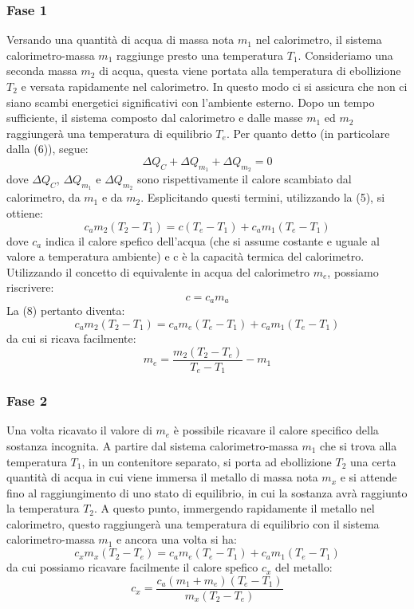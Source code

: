 \subsubsection{Fase 1}
Versando una quantità di acqua di massa nota $m_1$ nel calorimetro, il sistema calorimetro-massa $m_1$ raggiunge presto una temperatura $T_1$. Consideriamo una seconda massa $m_2$ di acqua, questa viene portata alla temperatura di ebollizione $T_2$ e versata rapidamente nel calorimetro. In questo modo ci si assicura che non ci siano scambi energetici significativi con l'ambiente esterno. Dopo un tempo sufficiente, il sistema composto dal calorimetro e dalle masse $m_1$ ed $m_2$ raggiungerà una temperatura di equilibrio $T_e$. Per quanto detto (in particolare dalla (6)), segue:
\begin{equation}
    \Delta Q_C + \Delta Q_{m_1} + \Delta Q_{m_2} = 0
\end{equation}
dove $\Delta Q_C$, $\Delta Q_{m_1}$ e $\Delta Q_{m_2}$ sono rispettivamente il calore scambiato dal calorimetro, da $m_1$ e da $m_2$. Esplicitando questi termini, utilizzando la (5), si ottiene:
\begin{equation}
    c_am_2(T_2 - T_1) = c(T_e - T_1) + c_am_1(T_e - T_1)
\end{equation}
dove $c_a$ indica il calore spefico dell'acqua (che si assume costante e uguale al valore a temperatura ambiente) e c è la capacità termica del calorimetro. Utilizzando il concetto di equivalente in acqua del calorimetro $m_e$, possiamo riscrivere:
\begin{equation}
    c = c_am_a
\end{equation}
La (8) pertanto diventa:
\begin{equation}
    c_am_2(T_2 - T_1) = c_am_e(T_e - T_1) + c_am_1(T_e - T_1)
\end{equation}
da cui si ricava facilmente:
\begin{equation}
    m_e = \frac{m_2(T_2 - T_e)}{T_e - T_1}-m_1
\end{equation}

\subsubsection{Fase 2}
Una volta ricavato il valore di $m_e$ è possibile ricavare il calore specifico della sostanza incognita. A partire dal sistema calorimetro-massa $m_1$ che si trova alla temperatura $T_1$, in un contenitore separato, si porta ad ebollizione $T_2$ una certa quantità di acqua in cui viene immersa il metallo di massa nota $m_x$ e si attende fino al raggiungimento di uno stato di equilibrio, in cui la sostanza avrà raggiunto la temperatura $T_2$. A questo punto, immergendo rapidamente il metallo nel calorimetro, questo raggiungerà una temperatura di equilibrio con il sistema calorimetro-massa $m_1$ e ancora una volta si ha:
\begin{equation}
    c_xm_x(T_2 - T_e) = c_am_e(T_e - T_1) + c_am_1(T_e - T_1)
\end{equation}
da cui possiamo ricavare facilmente il calore spefico $c_x$ del metallo:
\begin{equation}
    c_x = \frac{c_a(m_1 + m_e)(T_e - T_1)}{m_x(T_2 - T_e)}
\end{equation}



